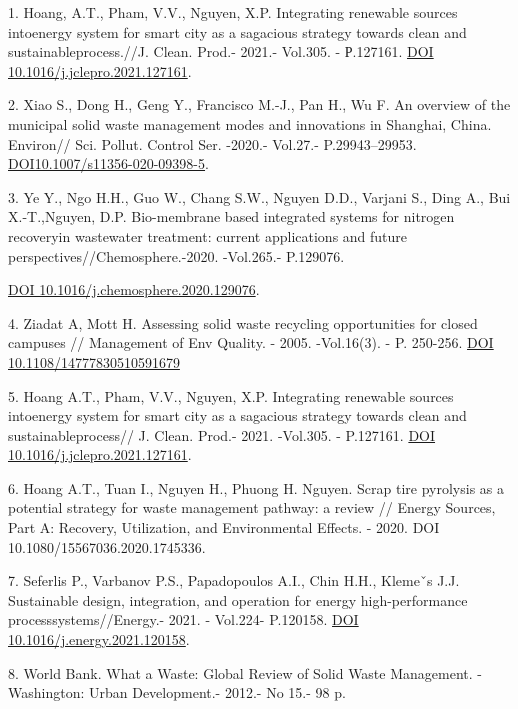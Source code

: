 \begin{references}
1. Hoang, A.T., Pham, V.V., Nguyen, X.P. Integrating renewable sources
intoenergy system for smart city as a sagacious strategy towards clean
and sustainableprocess.//J. Clean. Prod.- 2021.- Vol.305. - Р.127161.
\href{https://doi.org/10.1016/j.jclepro.2021.127161}{DOI
10.1016/j.jclepro.2021.127161}.

2. Xiao S., Dong H., Geng Y., Francisco M.-J., Pan H., Wu F. An overview
of the municipal solid waste management modes and innovations in
Shanghai, China. Environ// Sci. Pollut. Control Ser. -2020.- Vol.27.-
P.29943--29953.
\href{https://doi.org/10.1007/s11356-020-09398-5}{DOI10.1007/s11356-020-09398-5}.

3. Ye Y., Ngo H.H., Guo W., Chang S.W., Nguyen D.D., Varjani S., Ding
A., Bui X.-T.,Nguyen, D.P. Bio-membrane based integrated systems for
nitrogen recoveryin wastewater treatment: current applications and
future perspectives//Chemosphere.-2020. -Vol.265.- P.129076.

\href{https://doi.org/10.1016/j.chemosphere.2020.129076}{DOI
10.1016/j.chemosphere.2020.129076}.

4. Ziadat A, Mott H. Assessing solid waste recycling opportunities for
closed campuses // Management of Env Quality. - 2005. -Vol.16(3). - P.
250-256. \href{https://doi.org/10.1108/14777830510591679}{DOI
10.1108/14777830510591679}

5. Hoang A.T., Pham, V.V., Nguyen, X.P. Integrating renewable sources
intoenergy system for smart city as a sagacious strategy towards clean
and sustainableprocess// J. Clean. Prod.- 2021. -Vol.305. - P.127161.
\href{https://doi.org/\%2010.1016/j.jclepro.2021.127161}{DOI
10.1016/j.jclepro.2021.127161}.

6. Hoang A.T., Tuan I., Nguyen H., Phuong H. Nguyen. Scrap tire
pyrolysis as a potential strategy for waste management pathway: a review
// Energy Sources, Part A: Recovery, Utilization, and Environmental
Effects. - 2020. DOI 10.1080/15567036.2020.1745336.

7. Seferlis P., Varbanov P.S., Papadopoulos A.I., Chin H.H., Klemeˇs
J.J. Sustainable design, integration, and operation for energy
high-performance processsystems//Energy.- 2021. - Vol.224- P.120158.
\href{https://doi.org/10.1016/j.energy.2021.120158}{DOI
10.1016/j.energy.2021.120158}.

8. World Bank. What a Waste: Global Review of Solid Waste Management.
-Washington: Urban Development.- 2012.- No 15.- 98 p.


\end{references}
